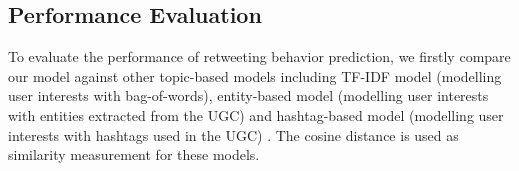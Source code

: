\documentclass{acm_proc_article-sp}
\begin{document}

\subsection{Performance Evaluation}

To evaluate the performance of retweeting behavior prediction, we firstly compare our model against other topic-based models including TF-IDF model (modelling user interests with bag-of-words), entity-based model (modelling user interests with entities extracted from the UGC) and hashtag-based model (modelling user interests with hashtags used in the UGC) \cite{abel2011analyzing}. The cosine distance is used as similarity measurement for these models.
\end{document}
